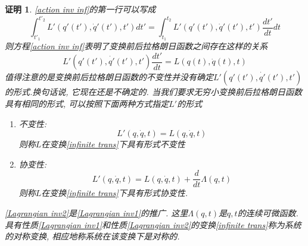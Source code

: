 \documentclass[a4paper,11pt]{article}
\theoremstyle{mystyle}
\newtheorem{Proof}{\hspace{2em}证明}[section]
\begin{document}
\begin{Proof}
  \eqref{action inv inf}的第一行可以写成
  \begin{equation*}
    \int_{t'_1}^{t'_2}L'(q'(t'),\dot{q}'(t'),t')dt'=\int_{t_1}^{t_2}L'(q'(t'),\dot{q}'(t'),t')\frac{dt'}{dt}dt
  \end{equation*}
  则方程\eqref{action inv inf}表明了变换前后拉格朗日函数之间存在这样的关系
  \begin{equation}\label{Lagrangian trans}
    L'(q'(t'),\dot{q'}(t'),t')\frac{dt'}{dt}=L(q(t),\dot{q}(t),t)
  \end{equation}
  值得注意的是变换前后拉格朗日函数的不变性并没有确定$L'(q'(t'),\dot{q'}(t'),t')$的形式.换句话说, 它现在还是不确定的. 当我们要求无穷小变换前后拉格朗日函数具有相同的形式, 可以按照下面两种方式指定$L'$的形式
  \begin{enumerate}[(1)]
    \item 不变性:\\
    \begin{equation}\label{Lagrangian inv1}
      L'(q,\dot{q},t)=L(q,\dot{q},t)
    \end{equation}
    则称$L$在变换\eqref{infinite trans}下具有形式不变性
    \item 协变性:\\
    \begin{equation}\label{Lagrangian inv2}
      L'(q,\dot{q},t)=L(q,\dot{q},t)+\frac{d}{dt}\Lambda(q,t)
    \end{equation}
    则称$L$在变换\eqref{infinite trans}下具有形式协变性.
  \end{enumerate}
  \eqref{Lagrangian inv2}是\eqref{Lagrangian inv1}的推广. 这里$\Lambda(q,t)$是$q,t$的连续可微函数. 具有性质\eqref{Lagrangian inv1}和性质\eqref{Lagrangian inv2}的变换\eqref{infinite trans}称为系统的对称变换, 相应地称系统在该变换下是对称的.


\end{Proof}
\end{document}
